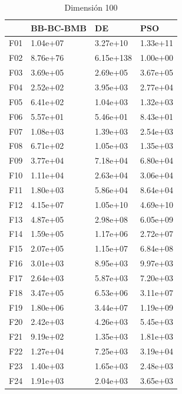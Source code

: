 \begin{table}[H]
\begin{minipage}{.5\linewidth}
    \end{minipage}%
    \begin{minipage}{.5\linewidth}
      \centering
      \caption{Dimensión 100}
      \begin{tabular}{llll}
        \toprule
        {} & BB-BC-BMB &         DE &       PSO \\
        \midrule
        F01  &  1.04e+07 &   3.27e+10 &  1.33e+11 \\
        F02  &  8.76e+76 &  6.15e+138 &  1.00e+00 \\
        F03  &  3.69e+05 &   2.69e+05 &  3.67e+05 \\
        F04  &  2.52e+02 &   3.95e+03 &  2.77e+04 \\
        F05  &  6.41e+02 &   1.04e+03 &  1.32e+03 \\
        F06  &  5.57e+01 &   5.46e+01 &  8.43e+01 \\
        F07  &  1.08e+03 &   1.39e+03 &  2.54e+03 \\
        F08  &  6.71e+02 &   1.05e+03 &  1.35e+03 \\
        F09  &  3.77e+04 &   7.18e+04 &  6.80e+04 \\
        F10  &  1.11e+04 &   2.63e+04 &  3.06e+04 \\
        F11  &  1.80e+03 &   5.86e+04 &  8.64e+04 \\
        F12  &  4.15e+07 &   1.05e+10 &  4.69e+10 \\
        F13  &  4.87e+05 &   2.98e+08 &  6.05e+09 \\
        F14  &  1.59e+05 &   1.17e+06 &  2.72e+07 \\
        F15  &  2.07e+05 &   1.15e+07 &  6.84e+08 \\
        F16  &  3.01e+03 &   8.95e+03 &  9.97e+03 \\
        F17  &  2.64e+03 &   5.87e+03 &  7.20e+03 \\
        F18  &  3.47e+05 &   6.53e+06 &  3.11e+07 \\
        F19  &  1.80e+06 &   3.44e+07 &  1.19e+09 \\
        F20  &  2.42e+03 &   4.26e+03 &  5.45e+03 \\
        F21  &  9.19e+02 &   1.35e+03 &  1.81e+03 \\
        F22  &  1.27e+04 &   7.25e+03 &  3.19e+04 \\
        F23  &  1.40e+03 &   1.65e+03 &  2.48e+03 \\
        F24  &  1.91e+03 &   2.04e+03 &  3.65e+03 \\

\end{tabular}
\end{minipage}
\end{table}

